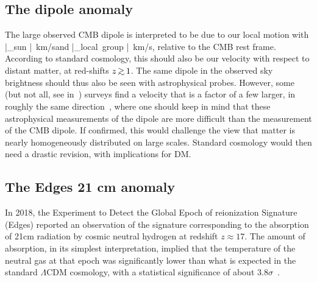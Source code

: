\subsection{The dipole anomaly}\label{sec:dipoleanomaly}
The large observed CMB dipole is interpreted to be due to our local motion with
\beq |_{\rm sun} | \,{\rm km/s}\qquad \hbox{and}\qquad
 |_{\rm local~group} | \,{\rm km/s},
 \eeq
relative to the CMB rest frame. 
According to standard cosmology, this should also be our velocity with respect to distant matter, at red-shifts $z\circa{>} 1$.
The same dipole in the observed sky brightness should thus also be seen with astrophysical probes. However, some (but not all, see  in~\cite{dipoleanomaly}) 
surveys find a velocity that is a factor of a few larger, in roughly the same direction~\cite{dipoleanomaly}, where one should keep in mind that 
these astrophysical measurements of the dipole are more difficult than the measurement of the CMB dipole.
If confirmed, this would challenge the view that matter is  nearly homogeneously distributed on large scales.
Standard cosmology would then need a drastic revision, with implications for DM.


\subsection{The {\sc Edges} 21 cm anomaly} \label{sec:EDGESanomaly}
In 2018, the Experiment to Detect the Global Epoch of reionization Signature ({\sc Edges}) reported an observation of the signature corresponding to the absorption of 21cm radiation by cosmic neutral hydrogen at redshift $z\approx 17$. The amount of absorption, in its simplest interpretation, implied that the temperature of the neutral gas at that epoch was significantly lower than what is expected in the standard $\Lambda$CDM cosmology, with a statistical significance of about $3.8\sigma$~\cite{EDGESexp}. 

\smallskip

